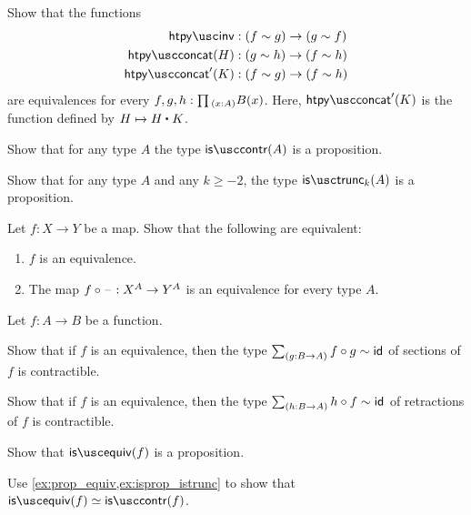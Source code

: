 \begin{exercises}
\exercise Show that the functions
\begin{align*}
\htpyinv & : (f \htpy g) \to (g \htpy f) \\
\htpyconcat(H) & : (g \htpy h) \to (f \htpy h) \\
\htpyconcat'(K) & : (f \htpy g) \to (f \htpy h)
\end{align*}
are equivalences for every $f,g,h : \prd{x:A}B(x)$. Here, $\htpyconcat'(K)$ is the function defined by $H\mapsto \ct{H}{K}$.
\exercise \label{ex:isprop_istrunc}
\begin{subexenum}
\item Show that for any type $A$ the type $\iscontr(A)$ is a proposition. %
\item Show that for any type $A$ and any $k\geq-2$, the type $\istrunc{k}(A)$ is a proposition.
\end{subexenum}
\exercise \label{lem:postcomp_equiv}
Let $f:X\to Y$ be a map. Show that the following are equivalent:
\begin{enumerate}
\item $f$ is an equivalence.
\item The map $f\circ\mathord{\hspace{1pt}\text{--}\hspace{1pt}} : X^A\to Y^A$ is an equivalence for every type $A$.
\end{enumerate}
\exercise \label{ex:isprop_isequiv}Let $f:A\to B$ be a function.
\begin{subexenum}
\item Show that if $f$ is an equivalence, then the type $\sm{g:B\to A}f\circ g\htpy \idfunc$ of sections of $f$ is contractible.
\item Show that if $f$ is an equivalence, then the type $\sm{h:B\to A}h\circ f\htpy \idfunc$ of retractions of $f$ is contractible.
\item Show that $\isequiv(f)$ is a proposition.
\item Use \cref{ex:prop_equiv,ex:isprop_istrunc} to show that $\isequiv(f)\eqvsym \iscontr(f)$.

\end{subexenum}
\end{exercises}
